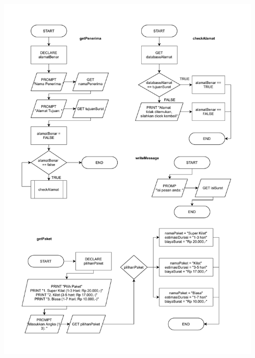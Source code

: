 \documentclass[
  12pt,
  answers  
]{exam}
\begin{document}
	\includegraphics[clip, scale=0.9, trim={1cm 1cm 1cm 1cm}]{pdf/Problem4-2.pdf}
\end{document}
